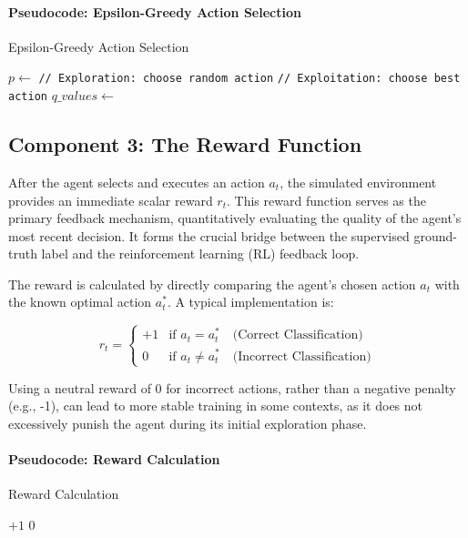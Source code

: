 \documentclass{report}
\begin{document}
\paragraph{Pseudocode: Epsilon-Greedy Action Selection}

\begin{algorithm}[H]
\caption{Epsilon-Greedy Action Selection}
\begin{algorithmic}[1]
    \State $p \gets$ 
        \State \texttt{// Exploration: choose random action}
        \State \Return {}
    \Else
        \State \texttt{// Exploitation: choose best action}
        \State $q\_values \gets$ 
        \State \Return {}
    \EndIf
\EndFunction
\end{algorithmic}
\end{algorithm}

\subsection{Component 3: The Reward Function}

After the agent selects and executes an action $a_t$, the simulated environment provides an immediate scalar reward $r_t$. This reward function serves as the primary feedback mechanism, quantitatively evaluating the quality of the agent's most recent decision. It forms the crucial bridge between the supervised ground-truth label and the reinforcement learning (RL) feedback loop.

The reward is calculated by directly comparing the agent's chosen action $a_t$ with the known optimal action $a^*_t$. A typical implementation is:

\[
r_t =
\begin{cases}
+1 & \text{if } a_t = a^*_t \quad \text{(Correct Classification)} \\
0 & \text{if } a_t \ne a^*_t \quad \text{(Incorrect Classification)}
\end{cases}
\]

Using a neutral reward of 0 for incorrect actions, rather than a negative penalty (e.g., -1), can lead to more stable training in some contexts, as it does not excessively punish the agent during its initial exploration phase.

\paragraph{Pseudocode: Reward Calculation}
\begin{algorithm}[H]
\caption{Reward Calculation}
\begin{algorithmic}[1]
        \State \Return $+1$ 
    \Else
        \State \Return $0$ 
    \EndIf
\EndFunction
\end{algorithmic}
\end{algorithm}
\end{document}

